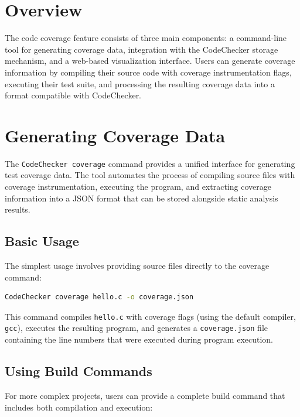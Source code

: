 \section{Overview}

The code coverage feature consists of three main components: a command-line tool for generating coverage data, integration with the CodeChecker storage mechanism, and a web-based visualization interface. Users can generate coverage information by compiling their source code with coverage instrumentation flags, executing their test suite, and processing the resulting coverage data into a format compatible with CodeChecker.

\section{Generating Coverage Data}

The \texttt{CodeChecker coverage} command provides a unified interface for generating test coverage data. The tool automates the process of compiling source files with coverage instrumentation, executing the program, and extracting coverage information into a JSON format that can be stored alongside static analysis results.

\subsection{Basic Usage}

The simplest usage involves providing source files directly to the coverage command:

\begin{lstlisting}[language=bash, caption={Generating coverage for a single source file}]
CodeChecker coverage hello.c -o coverage.json
\end{lstlisting}

This command compiles \texttt{hello.c} with coverage flags (using the default compiler, \texttt{gcc}), executes the resulting program, and generates a \texttt{coverage.json} file containing the line numbers that were executed during program execution.

\subsection{Using Build Commands}

For more complex projects, users can provide a complete build command that includes both compilation and execution:

